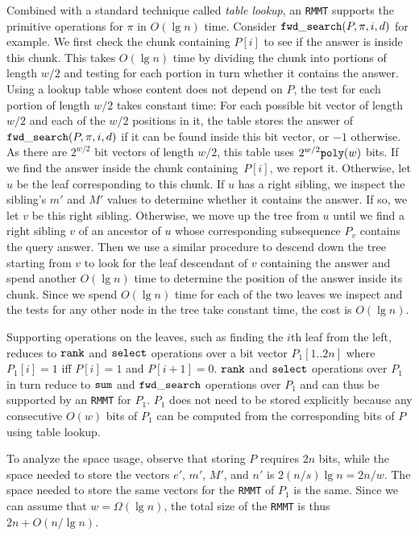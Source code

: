 Combined with a standard technique called {\em table lookup}, an {\tt RMMT}
supports the primitive operations
for $\pi$ in $O(\lg n)$ time.  Consider
$\mathtt{fwd\_search}(P,\pi,i,d)$ for example.  We first check the chunk containing $P[i]$
to see if the answer is inside this chunk.  This takes
$O(\lg n)$ time by dividing the chunk into portions of length $w/2$
and testing for each portion in turn whether it contains the answer.
Using a lookup table whose content does not
depend on $P$, the test for each portion of length $w/2$ takes
constant time: For each possible bit vector of length $w/2$ and each
of the $w/2$ positions in it, the table stores the answer
of $\mathtt{fwd\_search}(P,\pi,i,d)$ if it can be found inside this bit vector,
or $-1$ otherwise.  As there are $2^{w/2}$ bit vectors of length
$w/2$, this table uses $2^{w/2}\mathtt{poly}(w)$ bits.  If we find the answer
inside the chunk containing~$P[i]$, we report it.
Otherwise, let $u$ be the leaf corresponding to this
chunk.  If $u$ has a right sibling, we inspect the sibling's $m'$ and
$M'$ values to determine whether it contains the answer.  If so, we
let $v$ be this right sibling.  Otherwise, we move up the tree from
$u$ until we find a right sibling $v$ of an ancestor of $u$ whose
corresponding subsequence $P_v$ contains the query answer.  Then we
use a similar procedure to descend down the tree starting from $v$ to
look for the leaf descendant of $v$ containing the answer and spend
another $O(\lg n)$ time to determine the position of the answer
inside its chunk.  Since we spend $O(\lg n)$ time for each of
the two leaves we inspect and the tests for any other
node in the tree take constant time, the cost is $O(\lg n)$.

Supporting operations on the leaves, such as finding the $i$th leaf
from the left, reduces to $\mathtt{rank}$ and $\mathtt{select}$ operations over
a bit vector $P_1[1..2n]$ where $P_1[i] = 1$ iff $P[i] = 1$ and
$P[i+1] = 0$.  $\mathtt{rank}$ and $\mathtt{select}$ operations over $P_1$ in turn
reduce to $\mathtt{sum}$ and $\mathtt{fwd\_search}$ operations over $P_1$ and can thus
be supported by an {\tt RMMT} for $P_1$.  $P_1$ does not need to be
stored explicitly because any consecutive $O(w)$ bits of $P_1$ can be
computed from the corresponding bits of $P$ using table lookup.

To analyze the space usage, observe that storing $P$ requires $2n$
bits, while the space needed to store the vectors $e'$, $m'$, $M'$,
and $n'$ is $2(n/s) \lg n = 2n/w$.  The space needed to store the same
vectors for the {\tt RMMT} of $P_1$ is the same.  Since we can assume
that $w = \Omega(\lg n)$, the total size of the {\tt RMMT} is thus
$2n + O(n / \lg n)$.

